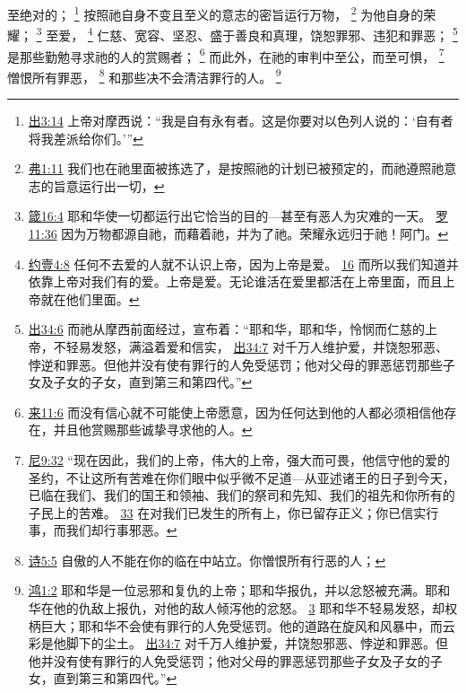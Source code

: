 \documentclass[12pt, a4paper, oneside]{ctexart}
\begin{document}
	至绝对的；
	\footnote {
		\href{https://biblehub.com/exodus/3-14.htm}{出3:14} 上帝对摩西说：“我是自有永有者。这是你要对以色列人说的：‘自有者将我差派给你们。’”
	}
	按照祂自身不变且至义的意志的密旨运行万物，
	\footnote {
		\href{https://biblehub.com/ephesians/1-11.htm}{弗1:11} 我们也在祂里面被拣选了，是按照祂的计划已被预定的，而祂遵照祂意志的旨意运行出一切，
	}
	为他自身的荣耀；
	\footnote {
		\href{https://biblehub.com/proverbs/16-4.htm}{箴16:4} 耶和华使一切都运行出它恰当的目的---甚至有恶人为灾难的一天。
		\href{https://biblehub.com/romans/11-36.htm}{罗11:36} 因为万物都源自祂，而藉着祂，并为了祂。荣耀永远归于祂！阿门。
	}
	至爱，
	\footnote {
		\href{https://biblehub.com/1_john/4-8.htm}{约壹4:8} 任何不去爱的人就不认识上帝，因为上帝是爱。
		\href{https://biblehub.com/1_john/4-16.htm}{16} 而所以我们知道并依靠上帝对我们有的爱。上帝是爱。无论谁活在爱里都活在上帝里面，而且上帝就在他们里面。
	}
	仁慈、宽容、坚忍、盛于善良和真理，饶恕罪邪、违犯和罪恶；
	\footnote {
		\href{https://biblehub.com/exodus/34-6.htm}{出34:6} 而祂从摩西前面经过，宣布着：“耶和华，耶和华，怜悯而仁慈的上帝，不轻易发怒，满溢着爱和信实，
		\href{https://biblehub.com/exodus/34-7.htm}{出34:7} 对千万人维护爱，并饶恕邪恶、悖逆和罪恶。但他并没有使有罪行的人免受惩罚；他对父母的罪恶惩罚那些子女及子女的子女，直到第三和第四代。”
	}
	是那些勤勉寻求祂的人的赏赐者；
	\footnote {
		\href{https://biblehub.com/hebrews/11-6.htm}{来11:6} 而没有信心就不可能使上帝愿意，因为任何达到他的人都必须相信他存在，并且他赏赐那些诚挚寻求他的人。
	}
	而此外，在祂的审判中至公，而至可惧，
	\footnote {
		\href{https://biblehub.com/nehemiah/9-32.htm}{尼9:32} “现在因此，我们的上帝，伟大的上帝，强大而可畏，他信守他的爱的圣约，不让这所有苦难在你们眼中似乎微不足道---从亚述诸王的日子到今天，已临在我们、我们的国王和领袖、我们的祭司和先知、我们的祖先和你所有的子民上的苦难。
		\href{https://biblehub.com/nehemiah/9-33.htm}{33} 在对我们已发生的所有上，你已留存正义；你已信实行事，而我们却行事邪恶。
	}
	憎恨所有罪恶，
	\footnote {
		\href{https://biblehub.com/psalms/5-5.htm}{诗5:5} 自傲的人不能在你的临在中站立。你憎恨所有行恶的人；
	}
	和那些决不会清洁罪行的人。
	\footnote {
		\href{https://biblehub.com/nahum/1-2.htm}{鸿1:2} 耶和华是一位忌邪和复仇的上帝；耶和华报仇，并以忿怒被充满。耶和华在他的仇敌上报仇，对他的敌人倾泻他的忿怒。
		\href{https://biblehub.com/nahum/1-3.htm}{3} 耶和华不轻易发怒，却权柄巨大；耶和华不会使有罪行的人免受惩罚。他的道路在旋风和风暴中，而云彩是他脚下的尘土。
		\href{https://biblehub.com/exodus/34-7.htm}{出34:7} 对千万人维护爱，并饶恕邪恶、悖逆和罪恶。但他并没有使有罪行的人免受惩罚；他对父母的罪恶惩罚那些子女及子女的子女，直到第三和第四代。”
	}
\end{document}
